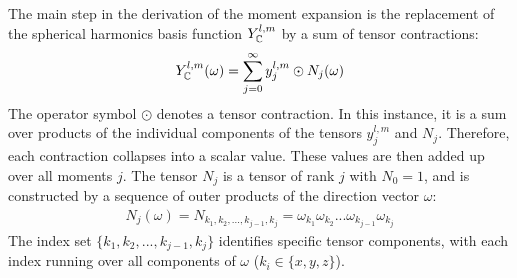 The main step in the derivation of the moment expansion is the replacement of the spherical harmonics basis function $Y_{\mathbb{C}}^{l,m}$ by a sum of tensor contractions:
\begin{align}
\label{eq:fld_moment_expansion_sum}
Y_{\mathbb{C}}^{l,m}(\omega) =
\sum_{j=0}^\infty{y^{l,m}_j\odot N_j(\omega)}
\end{align}
The operator symbol $\odot$ denotes a tensor contraction. In this instance, it is a sum over products of the individual components of the tensors $y^{l,m}_j$ and $N_j$. Therefore, each contraction collapses into a scalar value. These values are then added up over all moments $j$. The tensor $N_j$ is a tensor of rank $j$ with $N_0=1$, and is constructed by a sequence of outer products of the direction vector $\omega$:
\begin{align}
N_j\left(\omega\right)
=N_{k_1, k_2, ..., k_{j-1}, k_j} 
=\omega_{k_1}\omega_{k_2}...\omega_{k_{j-1}}\omega_{k_j} 
\end{align}
The index set $\{k_1, k_2, ..., k_{j-1}, k_j\}$ identifies specific tensor components, with each index running over all components of $\omega$ ($k_i \in \{x, y, z\}$).

